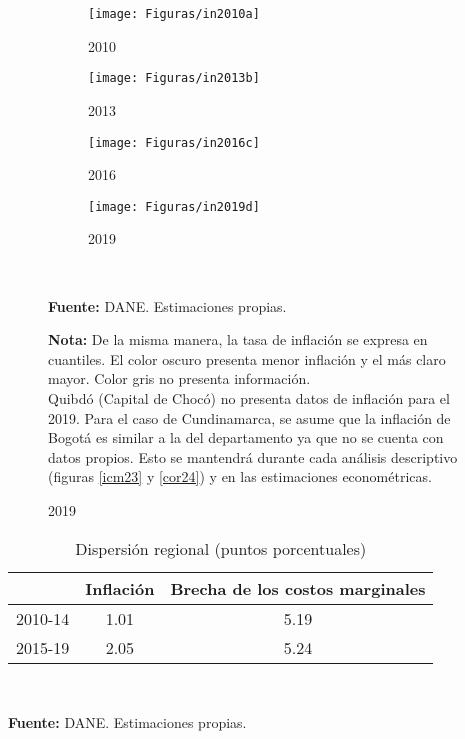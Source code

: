 \begin{figure}[H]
\caption{Inflación en Colombia}
\begin{subfigure}{0.22\textwidth}
  \centering
	\texttt{[image: Figuras/in2010a]} 
  \caption{2010}
  \label{A41}
\end{subfigure}
\begin{subfigure}{0.22\textwidth}
  \centering
	\texttt{[image: Figuras/in2013b]} 
  \caption{2013}
  \label{A42}
\end{subfigure}
\begin{subfigure}{0.22\textwidth}
  \centering
	\texttt{[image: Figuras/in2016c]} 
  \caption{2016}
  \label{A43}
\end{subfigure}
\begin{subfigure}{0.22\textwidth}
  \centering
	\texttt{[image: Figuras/in2019d]} 
  \caption{2019}
  \label{A44}
\end{subfigure}\\
  \raggedright  \scriptsize \textbf{Fuente:} DANE. Estimaciones propias.\\
\raggedright  \scriptsize \textbf{Nota:} De la misma manera, la tasa de inflación se expresa en cuantiles. El color oscuro presenta menor inflación y el más claro mayor. Color gris no presenta información.\\
Quibdó (Capital de Chocó) no presenta datos de inflación para el 2019. Para el caso de Cundinamarca, se asume que la inflación de Bogotá es similar a la del departamento ya que no se cuenta con datos propios. Esto se mantendrá durante cada análisis descriptivo (figuras \ref{icm23} y \ref{cor24}) y en las estimaciones econométricas.
\label{infla21}	
\end{figure}

\begin{table}[H]
\centering
\caption{Dispersión regional (puntos porcentuales)}
\begin{tabular}{ccc}
\hline
& Inflación   & Brecha de los costos marginales \\
\hline
\hline
2010-14 & 1.01  & 5.19  \\
2015-19 &  2.05  & 5.24 \\
\hline
\end{tabular}%
\label{dispt} \\
  \raggedright  \scriptsize \textbf{Fuente:} DANE. Estimaciones propias.
\end{table}%

